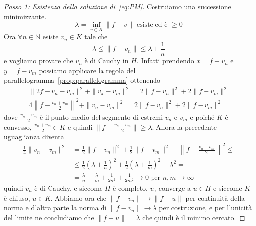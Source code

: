 \begin{proof}[Passo 1: Esistenza della soluzione
    di~\eqref{eq:PM}]\label{pf:Proiezioni-1}
    Costruiamo una successione minimizzante.
    \[
      \lambda = \inf_{v \in K} \|f-v\| \text{ esiste ed è } \ge 0
    \]
    Ora \(\forall n \in \mathbb{N}\) esiste \(v_{n} \in K\) tale che 
    \[
      \lambda \le \| f- v_{n}\| \le \lambda + \frac{1}{n}
    \] e vogliamo provare che \(v_{n}\) è di Cauchy in \(H\). Infatti prendendo
    \(x = f - v_{n}\) e \(y = f - v_{m}\) possiamo applicare la regola del
    parallelogramma~\ref{prop:parallelogramma} ottenendo
    \begin{align*}
        \|2f - v_{n} - v_{m}\|^2 + \|v_{n} - v_{m}\|^2 = 2\|f - v_{n}\|^2 + 2\|f
        - v_{m}\|^2 \\
        4\left\|f - \frac{v_{n} + v_{m}}{2}\right\|^2 + \|v_{n} - v_{m}\|^2 = 2\|f -
        v_{n}\|^2 + 2\|f - v_{m}\|^2
    \end{align*}
    dove \(\frac{v_{n} + v_{m}}{2}\) è il punto medio del segmento di estremi
    \(v_{n}\) e \(v_{m}\) e poiché \(K\) è convesso, \(\frac{v_{n}+v_{m}}{2} \in
    K\) e quindi \(\|f - \frac{v_{n} + v_{m}}{2}\| \ge \lambda\). Allora la
    precedente uguaglianza diventa
    \begin{align*}
        \frac{1}{4}\|v_{n} - v_{m}\|^2 &= \frac{1}{2}\|f - v_{n}\|^2 +
      \frac{1}{2}\|f - v_{m}\|^2 - \left\|f - \frac{v_{n} + v_{m}}{2}\right\|^2
      \le 
      \\ &\le \frac{1}{2}{\left( \lambda + \frac{1}{n} \right)} ^2 +
        \frac{1}{2}{\left( \lambda + \frac{1}{m} \right)}^2 - \lambda^2 = \\ &=
      \frac{\lambda}{n} + \frac{\lambda}{m} + \frac{1}{2n^2} + \frac{1}{2m^2}
      \longrightarrow 0 \text{ per } n, m \to \infty
    \end{align*}
    quindi \(v_{n}\) è di Cauchy, e siccome \(H\) è
    completo, \(v_{n}\) converge a \(u \in H\) e siccome \(K\) è chiuso, \(u \in
    K\). 
    Abbiamo ora che \(\|f-v_{n}\| \to \|f - u\|\) per continuità della norma e
    d'altra parte la norma di \(\|f - v_{n}\| \to \lambda\) per costruzione, e
    per l'unicità del limite ne concludiamo che \(\|f - u\| = \lambda\) che
    quindi è il minimo cercato.
\end{proof}
